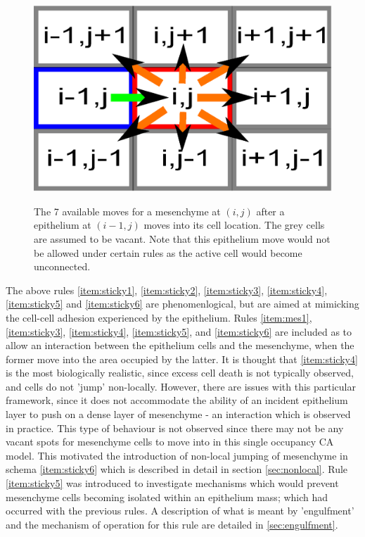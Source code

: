 \documentclass[pdftex,10pt,a4paper]{article}
\begin{document}
\begin{figure}[ht] 
\centering
\scalebox{0.5} 
{\includegraphics{8-NN.eps}}
\caption{The 7 available moves for a mesenchyme at $(i,j)$ after a epithelium at $(i-1,j)$ moves into its cell location. The grey cells are assumed to be vacant. Note that this epithelium move would not be allowed under certain rules as the active cell would become unconnected.}\label{fig:8NN}
\end{figure} 



The above rules \ref{item:sticky1}, \ref{item:sticky2}, \ref{item:sticky3}, \ref{item:sticky4}, \ref{item:sticky5} and \ref{item:sticky6} are phenomenlogical, but are aimed at mimicking the cell-cell adhesion experienced by the epithelium. Rules \ref{item:mes1}, \ref{item:sticky3}, \ref{item:sticky4}, \ref{item:sticky5}, and \ref{item:sticky6} are included as to allow an interaction between the epithelium cells and the mesenchyme, when the former move into the area occupied by the latter. It is thought that \ref{item:sticky4} is the most biologically realistic, since excess cell death is not typically observed, and cells do not 'jump' non-locally. However, there are issues with this particular framework, since it does not accommodate the ability of an incident epithelium layer to push on a dense layer of mesenchyme - an interaction which is observed in practice. This type of behaviour is not observed since there may not be any vacant spots for mesenchyme cells to move into in this single occupancy CA model. This motivated the introduction of non-local jumping of mesenchyme in schema \ref{item:sticky6} which is described in detail in section \ref{sec:nonlocal}. Rule \ref{item:sticky5} was introduced to investigate mechanisms which would prevent mesenchyme cells becoming isolated within an epithelium mass; which had occurred with the previous rules. A description of what is meant by 'engulfment' and the mechanism of operation for this rule are detailed in \ref{sec:engulfment}.
\end{document}
